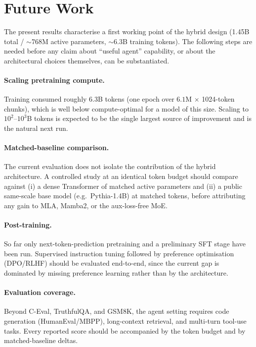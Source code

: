 \section{Future Work}
\label{sec:futurework}

The present results characterise a first working point of the hybrid design
(1.45B total / $\sim$768M active parameters, $\sim$6.3B training tokens). The
following steps are needed before any claim about ``useful agent'' capability, or
about the architectural choices themselves, can be substantiated.

\paragraph{Scaling pretraining compute.}
Training consumed roughly $6.3$B tokens (one epoch over $6.1$M $\times$ 1024-token
chunks), which is well below compute-optimal for a model of this size. Scaling to
$10^2$--$10^3$B tokens is expected to be the single largest source of improvement and
is the natural next run.

\paragraph{Matched-baseline comparison.}
The current evaluation does not isolate the contribution of the hybrid architecture.
A controlled study at an identical token budget should compare against (i) a dense
Transformer of matched active parameters and (ii) a public same-scale base model
(e.g.\ Pythia-1.4B) at matched tokens, before attributing any gain to MLA, Mamba2, or
the aux-loss-free MoE.

\paragraph{Post-training.}
So far only next-token-prediction pretraining and a preliminary SFT stage have been
run. Supervised instruction tuning followed by preference optimisation (DPO/RLHF)
should be evaluated end-to-end, since the current gap is dominated by missing
preference learning rather than by the architecture.

\paragraph{Evaluation coverage.}
Beyond C-Eval, TruthfulQA, and GSM8K, the agent setting requires code generation
(HumanEval/MBPP), long-context retrieval, and multi-turn tool-use tasks. Every reported
score should be accompanied by the token budget and by matched-baseline deltas.

